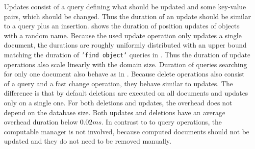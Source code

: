 Updates consist of a query defining what should be updated and some
key-value pairs, which should be changed. Thus the duration of an
update should be similar to a query plus an
insertion.  shows the duration of
position updates of objects with a random name. Because the used
update operation only updates a single document, the durations are
roughly uniformly distributed with an upper bound matching the
duration of \texttt{'find object'} queries in
. Thus the duration of update operations
also scale linearly with the domain size. Duration of queries
searching for only one document also behave as in
.  Because delete operations also consist
of a query and a fast change operation, they behave similar to
updates. The difference is that by default deletions are executed on
all documents and updates only on a single one. For both deletions and
updates, the overhead does not depend on the database size. Both
updates and deletions have an average overhead duration below
$0.02ms$. In contrast to to query operations, the computable manager
is not involved, because computed documents should not be updated and
they do not need to be removed manually.

